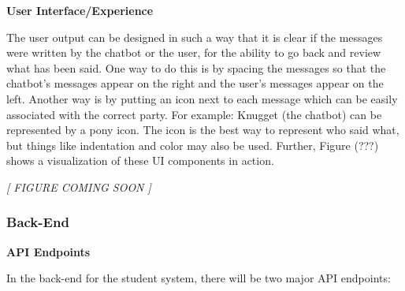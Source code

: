 \documentclass[titlepage, 12pt]{article}
\begin{document}
\textbf{User Interface/Experience}

The user output can be designed in such a way that it is clear if the messages were written by the chatbot or the user, for the ability to go back and review what has been said. One way to do this is by spacing the messages so that the chatbot’s messages appear on the right and the user’s messages appear on the left. Another way is by putting an icon next to each message which can be easily associated with the correct party. For example: Knugget (the chatbot) can be represented by a pony icon. The icon is the best way to represent who said what, but things like indentation and color may also be used. Further, Figure (???) shows a visualization of these UI components in action.

\begin{center}\emph{[ FIGURE COMING SOON ]}\end{center}

\subsubsection{Back-End}

\textbf{API Endpoints}

In the back-end for the student system, there will be two major API endpoints:
\end{document}

